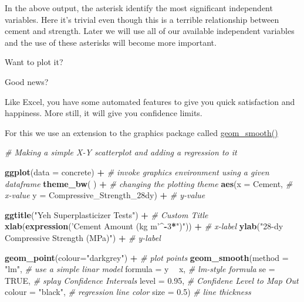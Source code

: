 \documentclass[]{article}
\newenvironment{Shaded}{\begin{snugshade}}{\end{snugshade}}
\newcommand{\CommentTok}[1]{\textcolor[rgb]{0.56,0.35,0.01}{\textit{#1}}}
\newcommand{\DataTypeTok}[1]{\textcolor[rgb]{0.13,0.29,0.53}{#1}}
\newcommand{\DecValTok}[1]{\textcolor[rgb]{0.00,0.00,0.81}{#1}}
\newcommand{\FloatTok}[1]{\textcolor[rgb]{0.00,0.00,0.81}{#1}}
\newcommand{\KeywordTok}[1]{\textcolor[rgb]{0.13,0.29,0.53}{\textbf{#1}}}
\newcommand{\NormalTok}[1]{#1}
\newcommand{\OperatorTok}[1]{\textcolor[rgb]{0.81,0.36,0.00}{\textbf{#1}}}
\newcommand{\OtherTok}[1]{\textcolor[rgb]{0.56,0.35,0.01}{#1}}
\newcommand{\StringTok}[1]{\textcolor[rgb]{0.31,0.60,0.02}{#1}}
\begin{document}
In the above output, the asterisk identify the most significant
independent variables. Here it's trivial even though this is a terrible
relationship between cement and strength. Later we will use all of our
available independent variables and the use of these asterisks will
become more important.

Want to plot it?

Good news?

Like Excel, you have some automated features to give you quick
satisfaction and happiness. More still, it will give you confidence
limits.

For this we use an extension to the graphics package called
\href{https://ggplot2.tidyverse.org/reference/geom_smooth.html}{geom\_smooth()}

\begin{Shaded}
\begin{Highlighting}[]
\CommentTok{# Making a simple X-Y scatterplot and adding a regression to it}

\KeywordTok{ggplot}\NormalTok{(}\DataTypeTok{data =}\NormalTok{ concrete) }\OperatorTok{+}\StringTok{                }\CommentTok{# invoke graphics environment using a given dataframe}
\StringTok{  }
\StringTok{  }\KeywordTok{theme_bw}\NormalTok{( ) }\OperatorTok{+}\StringTok{                           }\CommentTok{# changing the plotting theme}
\StringTok{  }
\StringTok{  }\KeywordTok{aes}\NormalTok{(}\DataTypeTok{x      =}\NormalTok{ Cement,                       }\CommentTok{# x-value}
      \DataTypeTok{y      =}\NormalTok{ Compressive_Strength_28dy) }\OperatorTok{+}\StringTok{  }\CommentTok{# y-value}

\StringTok{  }\KeywordTok{ggtitle}\NormalTok{(}\StringTok{"Yeh Superplasticizer Tests"}\NormalTok{) }\OperatorTok{+}\StringTok{    }\CommentTok{# Custom Title}
\StringTok{  }
\StringTok{  }\KeywordTok{xlab}\NormalTok{(}\KeywordTok{expression}\NormalTok{(}\StringTok{'Cement Amount (kg m'}\OperatorTok{^-}\DecValTok{3}\OperatorTok{*}\StringTok{")"}\NormalTok{)) }\OperatorTok{+}\StringTok{   }\CommentTok{# x-label}
\StringTok{  }\KeywordTok{ylab}\NormalTok{(}\StringTok{"28-dy Compressive Strength (MPa)"}\NormalTok{)      }\OperatorTok{+}\StringTok{   }\CommentTok{# y-label}

\StringTok{  }\KeywordTok{geom_point}\NormalTok{(}\DataTypeTok{colour=}\StringTok{"darkgrey"}\NormalTok{) }\OperatorTok{+}\StringTok{  }\CommentTok{# plot points}
\StringTok{  }\KeywordTok{geom_smooth}\NormalTok{(}\DataTypeTok{method  =} \StringTok{"lm"}\NormalTok{,    }\CommentTok{# use a simple linar model}
              \DataTypeTok{formula =}\NormalTok{ y }\OperatorTok{~}\StringTok{ }\NormalTok{x,   }\CommentTok{# lm-style formula}
              \DataTypeTok{se      =} \OtherTok{TRUE}\NormalTok{,    }\CommentTok{# splay Confidence Intervals}
              \DataTypeTok{level   =} \FloatTok{0.95}\NormalTok{,    }\CommentTok{# Confidene Level to Map Out}
              \DataTypeTok{colour  =} \StringTok{"black"}\NormalTok{, }\CommentTok{# regression line color}
              \DataTypeTok{size    =} \FloatTok{0.5}\NormalTok{)     }\CommentTok{# line thickness}
\end{Highlighting}
\end{Shaded}
\end{document}
